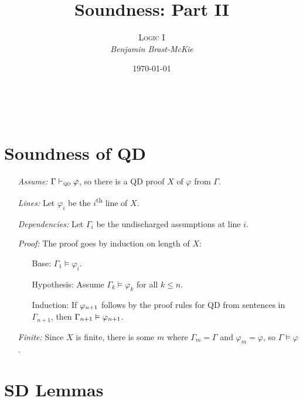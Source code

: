 \documentclass[a4paper, 11pt]{article} %
\title{\textbf{Soundness: Part II}} %
\author{\textsc{Logic I}\\ \em Benjamin Brast-McKie} %
\date{\today} %
\makeatletter
\renewcommand{\maketitle}{
\begin{flushright}
{\LARGE\@title}

\vspace{10pt}

{\@author}
\\ \@date
\end{flushright}

\vspace{0pt}

}
\makeatother
\begin{document}
\maketitle %

\thispagestyle{empty}





\section*{Soundness of QD}

\begin{enumerate}
  \item[\it Assume:] $\Gamma \vdash_{\textsc{qd}} \varphi$, so there is a QD proof $X$ of $\varphi$ from $\Gamma$. 
  \item[\it Lines:] Let $\varphi_i$ be the $i$\textsuperscript{th} line of $X$.
  \item[\it Dependencies:] Let $\Gamma_i$ be the undischarged assumptions at line $i$. 
  \item[\it Proof:] The proof goes by induction on length of $X$:
    \begin{itemize}
      \item[\sc Base:] $\Gamma_1 \vDash \varphi_i$. 
      \item[\sc Hypothesis:] Assume $\Gamma_k \vDash \varphi_k$ for all $k\leq n$.
      \item[\sc Induction:] If $\varphi_{n+1}$ follows by the proof rules for QD from sentences in $\Gamma_{n+1}$, then $\Gamma_{n+1} \vDash \varphi_{n+1}$.
    \end{itemize}
  \item[\it Finite:] Since $X$ is finite, there is some $m$ where $\Gamma_m=\Gamma$ and $\varphi_m=\varphi$, so $\Gamma \vDash \varphi$.
\end{enumerate}




\section*{SD Lemmas}
\end{document}
